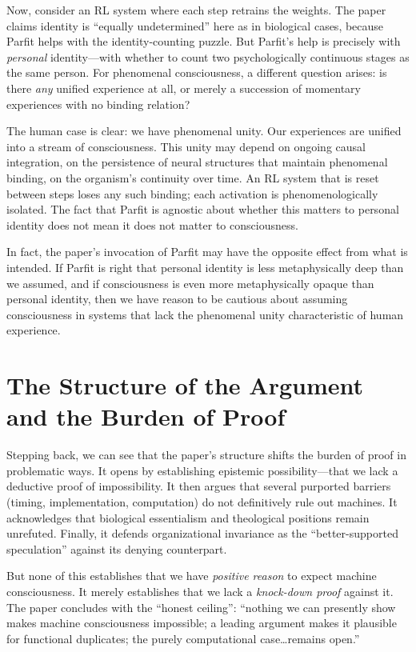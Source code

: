 \documentclass[11pt]{article}
\begin{document}
Now, consider an RL system where each step retrains the weights. The paper claims identity is ``equally undetermined'' here as in biological cases, because Parfit helps with the identity-counting puzzle. But Parfit's help is precisely with \textit{personal} identity---with whether to count two psychologically continuous stages as the same person. For phenomenal consciousness, a different question arises: is there \textit{any} unified experience at all, or merely a succession of momentary experiences with no binding relation?

The human case is clear: we have phenomenal unity. Our experiences are unified into a stream of consciousness. This unity may depend on ongoing causal integration, on the persistence of neural structures that maintain phenomenal binding, on the organism's continuity over time. An RL system that is reset between steps loses any such binding; each activation is phenomenologically isolated. The fact that Parfit is agnostic about whether this matters to personal identity does not mean it does not matter to consciousness.

In fact, the paper's invocation of Parfit may have the opposite effect from what is intended. If Parfit is right that personal identity is less metaphysically deep than we assumed, and if consciousness is even more metaphysically opaque than personal identity, then we have reason to be cautious about assuming consciousness in systems that lack the phenomenal unity characteristic of human experience.

\section{The Structure of the Argument and the Burden of Proof}

Stepping back, we can see that the paper's structure shifts the burden of proof in problematic ways. It opens by establishing epistemic possibility---that we lack a deductive proof of impossibility. It then argues that several purported barriers (timing, implementation, computation) do not definitively rule out machines. It acknowledges that biological essentialism and theological positions remain unrefuted. Finally, it defends organizational invariance as the ``better-supported speculation'' against its denying counterpart.

But none of this establishes that we have \textit{positive reason} to expect machine consciousness. It merely establishes that we lack a \textit{knock-down proof} against it. The paper concludes with the ``honest ceiling'': ``nothing we can presently show makes machine consciousness impossible; a leading argument makes it plausible for functional duplicates; the purely computational case\ldots remains open.''
\end{document}
